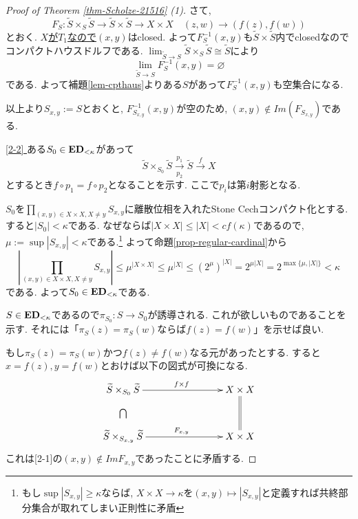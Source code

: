 \documentclass[dvipdfmx,a4paper,11pt]{report}
\theoremstyle{definition}
\begin{document}
\begin{proof}[Proof of Theorem \ref{thm-Scholze-21516} (1)]
さて, 
$$
F_S : \widetilde{S} \times_{S} \widetilde{S} \to \widetilde{S} \times  \widetilde{S} \to X \times X
\quad (z,w) \to (f(z), f(w))
$$
とおく. \underline{$X$が$T_1$なので}$(x,y)$はclosed. 
よって$F_{S}^{-1}(x,y)$も$\widetilde{S} \times \widetilde{S}$内でclosedなのでコンパクトハウスドルフである.
$\lim_{\widetilde{S} \to S} \widetilde{S} \times_{S} \widetilde{S} \cong \widetilde{S}$により
$$\lim_{\widetilde{S} \to S}F_{S}^{-1}(x,y)  
= \varnothing
$$
である. よって補題\ref{lem-cpthaus}よりある$S$があって$F_{S}^{-1}(x,y) $も空集合になる.

以上より$S_{x,y}:=S$とおくと, $F_{S_{x,y}}^{-1}(x,y) $が空のため, $(x,y) \not \in Im(F_{S_{x,y}})$である.

\underline{[2-2] } 
ある$S_0 \in {\bf ED}_{<\kappa}$があって
$$
\widetilde{S} \times_{S_0} \widetilde{S}
\underset{p_2}{\overset{p_1}{\to}}
\widetilde{S}
\overset{f}{\to} X
$$
とするとき$f \circ p_1 = f \circ p_2$となることを示す. 
ここで$p_i$は第$i$射影となる.

$S_0$を$\prod_{(x, y) \in X \times X, X \neq y}S_{x,y}$に離散位相を入れたStone Cechコンパクト化とする.
すると$|S_0| < \kappa$である. 
なぜならば$|X \times X| \le |X| < cf(\kappa)$であるので, 
$\mu:=\sup|S_{x,y}| < \kappa$である.\footnote{もし$\sup|S_{x,y}| \ge  \kappa $ならば, $X \times X \to \kappa$を$(x,y) \mapsto |S_{x,y}|$と定義すれば共終部分集合が取れてしまい正則性に矛盾}
よって命題\ref{prop-regular-cardinal}から
$$
|\prod_{(x, y) \in X \times X, X \neq y}S_{x,y}|
\le 
\mu^{|X \times X|}
\le 
\mu^{|X|}
\le (2^{\mu})^{|X|}
= 2^{\mu |X|}
= 2^{\max \{\mu, |X|\} }
< \kappa 
$$
である. 
よって$S_0 \in {\bf ED}_{< \kappa}$である.

$S \in {\bf ED}_{< \kappa}$であるので$\pi_{S_0} : S \to S_0$が誘導される. これが欲しいものであることを示す. 
それには「$\pi_{S}(z) =\pi_{S}(w)$ならば$f(z) =f(w)$」を示せば良い.

もし$\pi_{S}(z) =\pi_{S}(w)$かつ$f(z)  \neq f(w)$なる元があったとする. 
すると$x = f(z), y = f(w)$とおけば以下の図式が可換になる. 
\begin{equation*}
\xymatrix@C=80pt@R=30pt{
\widetilde{S} \times_{S_0} \widetilde{S}\ar@{->}[r]^{f \times f}
\ar@{}[d]|{\bigcap} 
&X \times X  \ar@{=}[d]
\\
\widetilde{S} \times_{S_{x,y}} \widetilde{S}\ar@{->}[r]^{F_{x,y}}
& X \times X
 \\   
}
\end{equation*}
これは[2-1]の$(x,y) \not \in Im F_{x,y}$であったことに矛盾する.


\end{proof}
\end{document}
